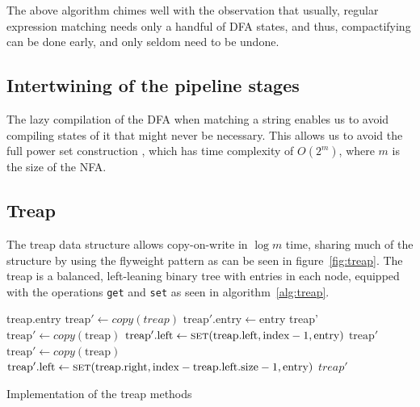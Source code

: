 \documentclass[english,twocolumn]{article}
\theoremstyle{definition}
\newcommand{\Figref}[1]{figure~\ref{fig:#1}}
\newcommand{\seclabel}[1]{\label{sec:#1}}
\begin{document}
The above algorithm chimes well with the observation that usually,
regular expression matching needs only a handful of DFA states, and thus,
compactifying can be done early, and only seldom need to be undone.

\subsection{Intertwining of the pipeline stages}
The lazy compilation of the DFA when matching a string enables us
to avoid compiling states of it that might never be necessary. This
allows us to avoid the full power set construction \cite{Sips05a}, which has 
time complexity of $O(2^m)$, where $m$ is the size of the NFA.

\subsection{Treap}	\seclabel{treap}
The treap data structure allows copy-on-write in $\log m$ time, sharing
much of the structure by using the flyweight pattern as can be seen in \Figref{treap}. The treap is a 
balanced, left-leaning binary tree with entries in each node, equipped
with the operations \texttt{get} and
\texttt{set} as seen in algorithm~\ref{alg:treap}.

\begin{algorithm*}
\begin{algorithmic}[1]
		\State \Return treap.entry
		\State \Return {}
	\Else
		\State \Return {}
	\EndIf
\EndFunction
\Statex
{}
		\State $\text{treap}'\gets copy(treap)$
		\State $\text{treap}'\text{.entry} \gets \text{entry}$
		\State \Return treap'
		\State $\text{treap}'\gets copy(\text{treap})$
		\State $\text{treap}'\text{.left} \gets \Call{set}{\text{treap.left}, \text{index}-1, \text{entry}}$
		\State \Return $\text{treap}'$
	\Else
		\State $\text{treap}'\gets copy(\text{treap})$
		\State $\text{treap}'\text{.left} \gets \Call{set}{\text{treap.right}, \text{index}-\text{treap.left.size}-1, \text{entry}}$
		\State \Return $treap'$
	\EndIf
\EndFunction
\end{algorithmic}
\caption{\label{alg:treap} Implementation of the treap methods}
\end{algorithm*}
\end{document}
